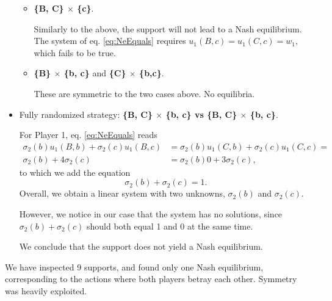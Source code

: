 \begin{example}
\begin{itemize}
\begin{itemize}
\item \textbf{\{B, C\} $\times$ \{c\}}.

Similarly to the above, the support will not lead to a Nash equilibrium. The system of eq. \ref{eq:NeEquals} requires $u_1(B,c) = u_1(C,c) = w_1, $ which fails to be true.

\item \textbf{\{B\} $\times$ \{b, c\}} and \textbf{\{C\} $\times$ \{b,c\}}.

These are  symmetric to the two cases above. No equilibria.

\end{itemize}
\item Fully randomized strategy: \textbf{\{B, C\} $\times$ \{b, c\} vs \{B, C\} $\times$ \{b, c\}}.

For Player 1, eq. \ref{eq:NeEquals} reads
$$
\begin{aligned}
 \sigma_2(b)u_1(B,b) + \sigma_2(c)u_1(B,c) & = \sigma_2(b)u_1(C,b) + \sigma_2(c)u_1(C,c)= \\
 \sigma_2(b) + 4 \sigma_2(c) & = \sigma_2(b) 0 + 3 \sigma_2(c),
 \end{aligned}
$$
to which we add the equation
$$ \sigma_2(b) + \sigma_2(c) = 1.$$
Overall, we obtain a linear system with two unknowns, $\sigma_2(b)$ and $\sigma_2(c)$.

However, we notice in our case that the system has no solutions, since $\sigma_2(b) + \sigma_2(c)$ should both equal 1 and 0 at the same time.

We conclude that the support does not yield a Nash equilibrium.
\end{itemize}

We have inspected 9 supports, and found only one Nash equilibrium, corresponding to the actions where both players betray each other. Symmetry was heavily exploited.

\label{chap3:ex:pdilemma}
\end{example}

